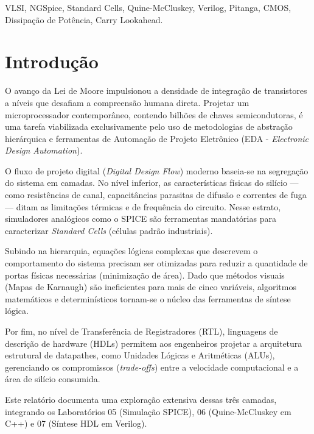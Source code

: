 \documentclass[conference]{IEEEtran}
\begin{document}
\begin{IEEEkeywords}
VLSI, NGSpice, Standard Cells, Quine-McCluskey, Verilog, Pitanga, CMOS, Dissipação de Potência, Carry Lookahead.
\end{IEEEkeywords}

\section{Introdução}
O avanço da Lei de Moore impulsionou a densidade de integração de transistores a níveis que desafiam a compreensão humana direta. Projetar um microprocessador contemporâneo, contendo bilhões de chaves semicondutoras, é uma tarefa viabilizada exclusivamente pelo uso de metodologias de abstração hierárquica e ferramentas de Automação de Projeto Eletrônico (EDA - \textit{Electronic Design Automation}).

O fluxo de projeto digital (\textit{Digital Design Flow}) moderno baseia-se na segregação do sistema em camadas. No nível inferior, as características físicas do silício — como resistências de canal, capacitâncias parasitas de difusão e correntes de fuga — ditam as limitações térmicas e de frequência do circuito. Nesse estrato, simuladores analógicos como o SPICE são ferramentas mandatórias para caracterizar \textit{Standard Cells} (células padrão industriais).

Subindo na hierarquia, equações lógicas complexas que descrevem o comportamento do sistema precisam ser otimizadas para reduzir a quantidade de portas físicas necessárias (minimização de área). Dado que métodos visuais (Mapas de Karnaugh) são ineficientes para mais de cinco variáveis, algoritmos matemáticos e determinísticos tornam-se o núcleo das ferramentas de síntese lógica.

Por fim, no nível de Transferência de Registradores (RTL), linguagens de descrição de hardware (HDLs) permitem aos engenheiros projetar a arquitetura estrutural de datapathes, como Unidades Lógicas e Aritméticas (ALUs), gerenciando os compromissos (\textit{trade-offs}) entre a velocidade computacional e a área de silício consumida. 

Este relatório documenta uma exploração extensiva dessas três camadas, integrando os Laboratórios 05 (Simulação SPICE), 06 (Quine-McCluskey em C++) e 07 (Síntese HDL em Verilog).

\end{document}
